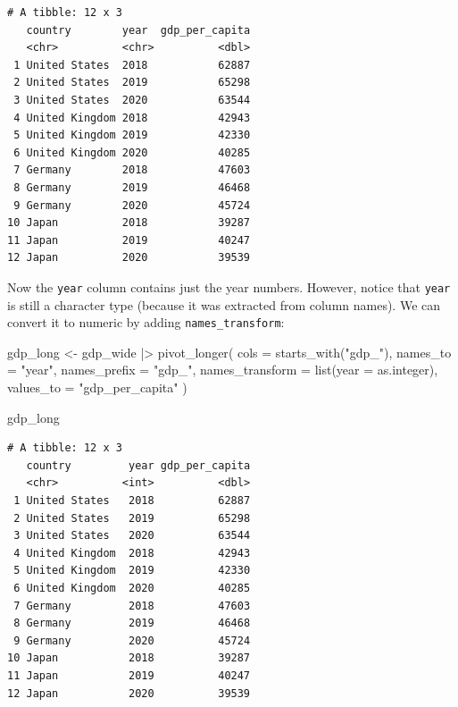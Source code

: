 \documentclass[
  letterpaper,
  DIV=11,
  numbers=noendperiod]{scrreprt}
\newenvironment{Shaded}{\begin{snugshade}}{\end{snugshade}}
\newcommand{\AttributeTok}[1]{\textcolor[rgb]{0.40,0.45,0.13}{#1}}
\newcommand{\FunctionTok}[1]{\textcolor[rgb]{0.28,0.35,0.67}{#1}}
\newcommand{\NormalTok}[1]{\textcolor[rgb]{0.00,0.23,0.31}{#1}}
\newcommand{\OtherTok}[1]{\textcolor[rgb]{0.00,0.23,0.31}{#1}}
\newcommand{\SpecialCharTok}[1]{\textcolor[rgb]{0.37,0.37,0.37}{#1}}
\newcommand{\StringTok}[1]{\textcolor[rgb]{0.13,0.47,0.30}{#1}}
\begin{document}
\begin{verbatim}
# A tibble: 12 x 3
   country        year  gdp_per_capita
   <chr>          <chr>          <dbl>
 1 United States  2018           62887
 2 United States  2019           65298
 3 United States  2020           63544
 4 United Kingdom 2018           42943
 5 United Kingdom 2019           42330
 6 United Kingdom 2020           40285
 7 Germany        2018           47603
 8 Germany        2019           46468
 9 Germany        2020           45724
10 Japan          2018           39287
11 Japan          2019           40247
12 Japan          2020           39539
\end{verbatim}

Now the \texttt{year} column contains just the year numbers. However,
notice that \texttt{year} is still a character type (because it was
extracted from column names). We can convert it to numeric by adding
\texttt{names\_transform}:

\begin{Shaded}
\begin{Highlighting}[]
\NormalTok{gdp\_long }\OtherTok{\textless{}{-}}\NormalTok{ gdp\_wide }\SpecialCharTok{|\textgreater{}}
  \FunctionTok{pivot\_longer}\NormalTok{(}
    \AttributeTok{cols =} \FunctionTok{starts\_with}\NormalTok{(}\StringTok{"gdp\_"}\NormalTok{),}
    \AttributeTok{names\_to =} \StringTok{"year"}\NormalTok{,}
    \AttributeTok{names\_prefix =} \StringTok{"gdp\_"}\NormalTok{,}
    \AttributeTok{names\_transform =} \FunctionTok{list}\NormalTok{(}\AttributeTok{year =}\NormalTok{ as.integer),}
    \AttributeTok{values\_to =} \StringTok{"gdp\_per\_capita"}
\NormalTok{  )}

\NormalTok{gdp\_long}
\end{Highlighting}
\end{Shaded}

\begin{verbatim}
# A tibble: 12 x 3
   country         year gdp_per_capita
   <chr>          <int>          <dbl>
 1 United States   2018          62887
 2 United States   2019          65298
 3 United States   2020          63544
 4 United Kingdom  2018          42943
 5 United Kingdom  2019          42330
 6 United Kingdom  2020          40285
 7 Germany         2018          47603
 8 Germany         2019          46468
 9 Germany         2020          45724
10 Japan           2018          39287
11 Japan           2019          40247
12 Japan           2020          39539
\end{verbatim}
\end{document}
